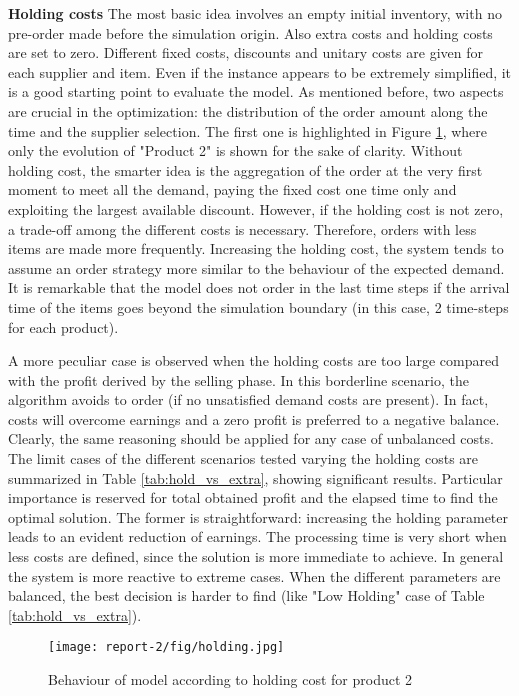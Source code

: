 \documentclass{article}
\begin{document}
\noindent
\textbf{Holding costs}\newline
The most basic idea involves an empty initial inventory, with no pre-order made before the simulation origin. Also extra costs and holding costs are set to zero. Different fixed costs, discounts and unitary costs are given for each supplier and item. Even if the instance appears to be extremely simplified, it is a good starting point to evaluate the model. 
As mentioned before, two aspects are crucial in the optimization: the distribution of the order amount along the time and the supplier selection. The first one is highlighted in Figure \ref{fig:holding_cost}, where only the evolution of "Product 2" is shown for the sake of clarity.
Without holding cost, the smarter idea is the aggregation of the order at the very first moment to meet all the demand, paying the fixed cost one time only and exploiting the largest available discount. However, if the holding cost is not zero, a trade-off among the different costs is necessary. Therefore, orders with less items are made more frequently. Increasing the holding cost, the system tends to assume an order strategy more similar to the behaviour of the expected demand. It is remarkable that the model does not order in the last time steps if the arrival time of the items goes beyond the simulation boundary (in this case, 2 time-steps for each product).\par
A more peculiar case is observed when the holding costs are too large compared with the profit derived by the selling phase. 
In this borderline scenario, the algorithm avoids to order (if no unsatisfied demand costs are present). In fact, costs will overcome earnings and a zero profit is preferred to a negative balance. Clearly, the same reasoning should be applied for any case of unbalanced costs.
\newpage
The limit cases of the different scenarios tested varying the holding costs are summarized in Table \ref{tab:hold_vs_extra}, showing significant results. Particular importance is reserved for total obtained profit and the elapsed time to find the optimal solution. The former is straightforward: increasing the holding parameter leads to an evident reduction of earnings. The processing time is very short when less costs are defined, since the solution is more immediate to achieve.
In general the system is more reactive to extreme cases. When the different parameters are balanced, the best decision is harder to find (like "Low Holding" case of Table \ref{tab:hold_vs_extra}).\par
\begin{figure}[H]
    \centering
    \texttt{[image: report-2/fig/holding.jpg]}
    \caption{Behaviour of model according to holding cost for product 2}
    \label{fig:holding_cost}
\end{figure}
\end{document}
